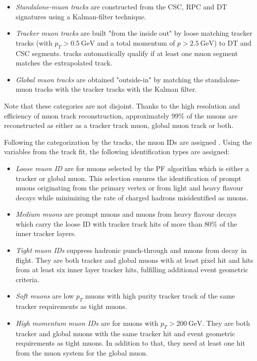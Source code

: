 \begin{itemize}
	\item[] \textit{Standalone-muon tracks} are constructed from the CSC, RPC and DT signatures using a Kalman-filter technique.
	\item[] \textit{Tracker muon tracks} are built "from the inside out" by loose matching tracker tracks (with $p_T > \SI{0.5}{\giga\electronvolt}$ and a total momentum of $p>\SI{2.5}{\giga\electronvolt}$) to DT and CSC segments. tracks automatically qualify if at least one muon segment matches the extrapolated track.
	\item[] \textit{Global muon tracks} are obtained "outside-in" by matching the standalone-muon tracks with the tracker tracks with the Kalman filter.
\end{itemize}

Note that these categories are not disjoint. Thanks to the high resolution and efficiency of muon track reconstruction, approximately 99\% of the muons are reconstructed as either as a tracker track muon, global muon track or both.

Following the categorization by the tracks, the muon IDs are assigned \cite{Sirunyan_2018_muons}. Using the variables from the track fit, the following identification types are assigned:

\begin{itemize}
	\item[] \textit{Loose muon ID} are for muons selected by the PF algorithm which is either a tracker or global muon. This selection ensures the identification of prompt muons originating from the primary vertex or from light and heavy flavour decays while minimizing the rate of charged hadrons misidentified as muons.
	\item[] \textit{Medium muons} are prompt muons and muons from heavy flavour decays which carry the loose ID with tracker track hits of more than 80\% of the inner tracker layers.
	\item[] \textit{Tight muon IDs} suppress hadronic punch-through and muons from decay in flight. They are both tracker and global muons with at least pixel hit and hits from at least six inner layer tracker hits, fulfilling additional event geometric criteria.
	\item[] \textit{Soft muons} are low $p_T$ muons with high purity tracker track of the same tracker requirements as tight muons.
	\item[] \textit{High momentum muon IDs} are for muons with $p_T > \SI{200}{\giga\electronvolt}$. They are both tracker and global muons with the same tracker hit and event geometric requirements as tight muons. In addition to that, they need at least one hit from the muon system for the global muon.
\end{itemize}